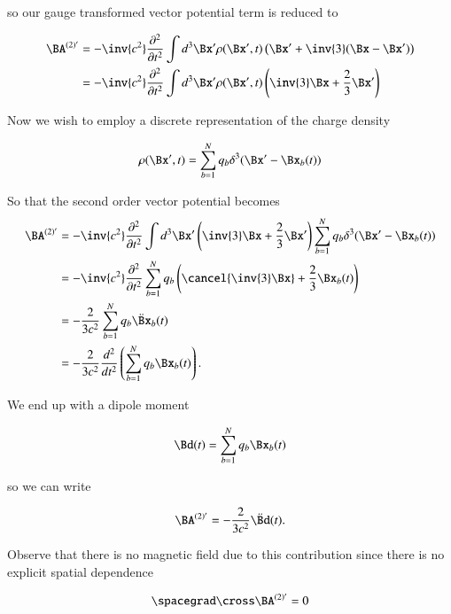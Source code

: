 so our gauge transformed vector potential term is reduced to

\begin{align*}
\BA^{(2)'} 
&= 
-\inv{c^2} \frac{\partial^2}{\partial t^2} \int d^3 \Bx' \rho(\Bx', t) \left(\Bx' + \inv{3}(\Bx - \Bx') \right) \\
&= 
-\inv{c^2} \frac{\partial^2}{\partial t^2} \int d^3 \Bx' \rho(\Bx', t) \left(\inv{3} \Bx + \frac{2}{3}\Bx' \right) \\
\end{align*}

Now we wish to employ a discrete representation of the charge density

\begin{equation}\label{eqn:relativisticElectrodynamicsL27:90}
\rho(\Bx', t) = \sum_{b=1}^N q_b \delta^3(\Bx' - \Bx_b(t))
\end{equation}

So that the second order vector potential becomes
\begin{align*}
\BA^{(2)'} 
&= 
-\inv{c^2} \frac{\partial^2}{\partial t^2} \int d^3 \Bx' \left(\inv{3} \Bx + \frac{2}{3}\Bx' \right) 
\sum_{b=1}^N q_b \delta^3(\Bx' - \Bx_b(t)) \\
&= 
-\inv{c^2} \frac{\partial^2}{\partial t^2} \sum_{b=1}^N q_b \left( \cancel{\inv{3} \Bx} + \frac{2}{3}\Bx_b(t) \right) \\
&=
-\frac{2}{3 c^2} 
\sum_{b=1}^N q_b \ddot{\Bx}_b(t) \\
&=
-\frac{2}{3 c^2} \frac{d^2}{dt^2}
\left( \sum_{b=1}^N q_b \Bx_b(t) \right).
\end{align*}

We end up with a dipole moment

\begin{equation}\label{eqn:relativisticElectrodynamicsL27:110}
\Bd(t) = \sum_{b=1}^N q_b \Bx_b(t) 
\end{equation}

so we can write

\begin{equation}\label{eqn:relativisticElectrodynamicsL27:130}
\BA^{(2)'} = -\frac{2}{3 c^2} \ddot{\Bd}(t).
\end{equation}

Observe that there is no magnetic field due to this contribution since there is no explicit spatial dependence

\begin{equation}\label{eqn:relativisticElectrodynamicsL27:150}
\spacegrad \cross \BA^{(2)'} = 0
\end{equation}

